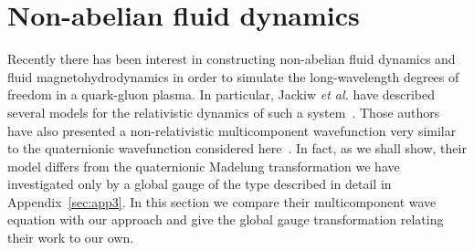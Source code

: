 \documentclass[a4paper,aps,prd,preprint,groupedaddress]{revtex4}
\begin{document}
\section{Non-abelian fluid dynamics}

Recently there has been interest in constructing non-abelian fluid dynamics and fluid magnetohydrodynamics in order to simulate the long-wavelength degrees of freedom in a quark-gluon plasma. In particular, Jackiw {\it et al.} have described several models for the relativistic dynamics of such a system~\cite{bib:jackiw1,bib:jackiw3}. Those authors have also presented a non-relativistic multicomponent wavefunction very similar to the quaternionic wavefunction considered here~\cite{bib:jackiw2}. In fact, as we shall show, their model differs from the quaternionic Madelung transformation we have investigated only by a global gauge of the type described in detail in Appendix~\ref{sec:app3}. In this section we compare their multicomponent wave equation with our approach and give the global gauge transformation relating their work to our own. 
\end{document}
